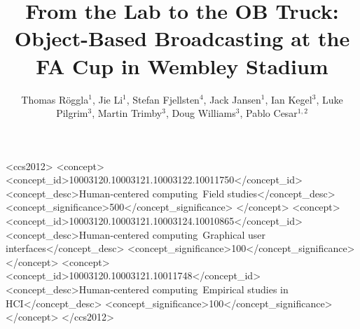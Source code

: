 \documentclass[sigchi-a, authorversion]{acmart}
\begin{document}
\title{From the Lab to the OB Truck: Object-Based Broadcasting at the FA Cup in Wembley Stadium}

\author{Thomas R\"{o}ggla$^1$, Jie Li$^1$, Stefan Fjellsten$^4$, Jack Jansen$^1$,  Ian Kegel$^3$, Luke Pilgrim$^3$, Martin Trimby$^3$, Doug Williams$^3$, Pablo Cesar$^{1,2}$}


\renewcommand{\shortauthors}{T. R\"{o}ggla et al.}


%
%
\begin{CCSXML}
    <ccs2012>
        <concept>
            <concept_id>10003120.10003121.10003122.10011750</concept_id>
            <concept_desc>Human-centered computing~Field studies</concept_desc>
            <concept_significance>500</concept_significance>
        </concept>
        <concept>
            <concept_id>10003120.10003121.10003124.10010865</concept_id>
            <concept_desc>Human-centered computing~Graphical user interfaces</concept_desc>
            <concept_significance>100</concept_significance>
        </concept>
        <concept>
            <concept_id>10003120.10003121.10011748</concept_id>
            <concept_desc>Human-centered computing~Empirical studies in HCI</concept_desc>
            <concept_significance>100</concept_significance>
        </concept>
    </ccs2012>
\end{CCSXML}

\end{document}
